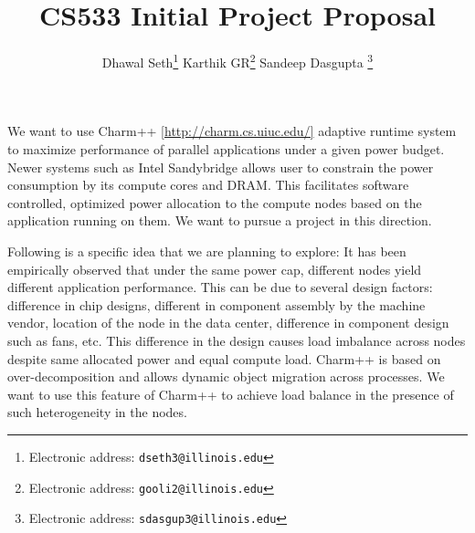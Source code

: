 \documentclass[10pt,twoside]{article}
\title{\textbf{ CS533 Initial Project Proposal}}
\author{Dhawal Seth\thanks{Electronic address: \texttt{dseth3@illinois.edu}}
\qquad Karthik GR\thanks{Electronic address: \texttt{gooli2@illinois.edu}}
\qquad  Sandeep Dasgupta \thanks{Electronic address:
\texttt{sdasgup3@illinois.edu}}}
\begin{document}
\thispagestyle{empty}

\maketitle

We want to use Charm++ \url{[http://charm.cs.uiuc.edu/]} adaptive runtime system to maximize performance of
parallel applications under a given power budget. Newer systems such as Intel
Sandybridge allows user to constrain the power consumption by its compute cores
and DRAM. This facilitates software controlled, optimized power allocation to
the compute nodes based on the application running on them. We want to pursue a
project in this direction.  

Following is a specific idea that we are planning to
explore: 
It has been empirically observed that under the same power cap,
different nodes yield different application performance. This can be due to
several design factors: difference in chip designs, different in component
assembly by the machine vendor, location of the node in the data center,
difference in component design such as fans, etc. This difference in the design
causes load imbalance across nodes despite same allocated power and equal
compute load. Charm++ is based on over-decomposition and allows dynamic object
migration across processes. We want to use this feature of Charm++ to achieve
load balance in the presence of such heterogeneity in the nodes.

%
\end{document}
